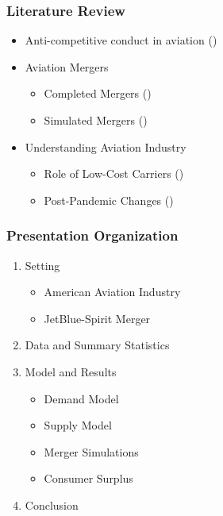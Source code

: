 \documentclass[xcolor=dvipsnames]{beamer}
\begin{document}
    \begin{frame}
		\frametitle{Literature Review}			\begin{itemize}
				\item Anti-competitive conduct in aviation (\cite{miller_did_2010, zou_assessing_2023})
				\item Aviation Mergers 
				\begin{itemize}
					\item Completed Mergers (\cite{luo_price_2014, carlton_are_2019})
					\item Simulated Mergers (\cite{ciliberto_market_2021, li_repositioning_2022})
				\end{itemize}
				\item Understanding Aviation Industry
				\begin{itemize}
					\item Role of Low-Cost Carriers (\cite{goolsbee_how_2008, shrago_spirit_2024})
					\item Post-Pandemic Changes (\cite{zou_assessing_2023, ewen_zoom_2023})
				\end{itemize}
        \end{itemize}
	\end{frame}
	
	\begin{frame}
		\frametitle{Presentation Organization}
		\begin{enumerate}
				\item Setting
				\begin{itemize}
					\item American Aviation Industry
					\item JetBlue-Spirit Merger
				\end{itemize}
				\item Data and Summary Statistics
				\item Model and Results 
				\begin{itemize}
					\item Demand Model
                    \item Supply Model
                    \item Merger Simulations
                    \item Consumer Surplus
				\end{itemize}
                \item Conclusion
			\end{enumerate}
	\end{frame}
\end{document}

